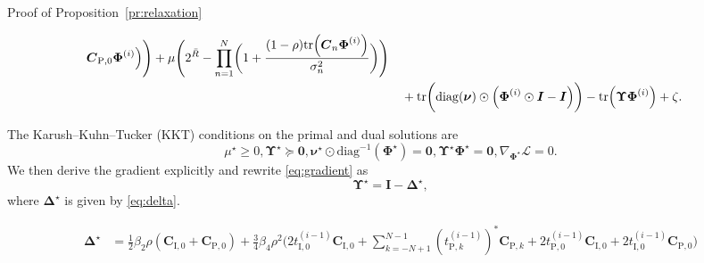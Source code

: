 \documentclass[journal]{IEEEtran}
\begin{document}
\begin{appendix}
\begin{subsection}{Proof of Proposition~\ref{pr:relaxation}}
\begin{figure*}[!b]
\begin{align}
							\boldsymbol{C}_{\mathrm{P},0} \boldsymbol{\Phi}^{(i)}
						\Bigr)
						\Biggr) + \mu \Biggl(
						2^{\bar{R}} - \prod_{n=1}^N \biggl(
							1 + \frac{(1-\rho) \mathrm{tr}\Bigl(
								\boldsymbol{C}_n \boldsymbol{\Phi}^{(i)}
							\Bigr)}{\sigma_n^2}
						\biggr)
					\Biggr)\nonumber\\
					& \quad + \mathrm{tr}\biggl(
						\mathrm{diag}(\boldsymbol{\nu}) \odot \Bigl(
							\boldsymbol{\Phi}^{(i)} \odot \boldsymbol{I} - \boldsymbol{I}
						\Bigr)
					\biggr) - \mathrm{tr} \Bigl(
						\boldsymbol{\Upsilon} \boldsymbol{\Phi}^{(i)}
					\Bigr) + \zeta.
				\end{align}
			\end{figure*}
			The Karush–Kuhn–Tucker (KKT) conditions on the primal and dual solutions are
			\begin{subequations}
				\begin{equation}\label{eq:lagrange_multiplier}
					\mu^\star \ge 0, \boldsymbol{\Upsilon}^\star \succeq \boldsymbol{0},
				\end{equation}
				\begin{equation}\label{eq:complementary_slackness}
					\boldsymbol{\nu}^\star \odot \mathrm{diag}^{-1}(\boldsymbol{\Phi}^\star) = \boldsymbol{0}, \boldsymbol{\Upsilon}^\star \boldsymbol{\Phi}^\star = \boldsymbol{0},
				\end{equation}
				\begin{equation}\label{eq:gradient}
					\nabla_{\boldsymbol{\Phi}^\star} \mathcal{L} = 0.
				\end{equation}
			\end{subequations}
			We then derive the gradient explicitly and rewrite \eqref{eq:gradient} as
			\begin{equation}
				\boldsymbol{\Upsilon}^\star = \boldsymbol{I} - \boldsymbol{\Delta}^\star,
			\end{equation}
			where $\boldsymbol{\Delta}^\star$ is given by \eqref{eq:delta}.
			\begin{figure*}[!b]
				\begin{align}\label{eq:delta}
					\boldsymbol{\Delta}^\star
					& = \frac{1}{2} \beta_2 \rho (\boldsymbol{C}_{\mathrm{I},0}+\boldsymbol{C}_{\mathrm{P},0}) + \frac{3}{4} \beta_4 \rho^2
						\Biggl(
							2 t_{\mathrm{I},0}^{(i-1)} \boldsymbol{C}_{\mathrm{I},0} + \sum_{k=-N+1}^{N-1} (t_{\mathrm{P},k}^{(i-1)})^* \boldsymbol{C}_{\mathrm{P},k} + 2 t_{\mathrm{P},0}^{(i-1)} \boldsymbol{C}_{\mathrm{I},0} + 2 t_{\mathrm{I},0}^{(i-1)} \boldsymbol{C}_{\mathrm{P},0}
						\Biggr)\nonumber\\

\end{align}
\end{figure*}
\end{subsection}
\end{appendix}
\end{document}
